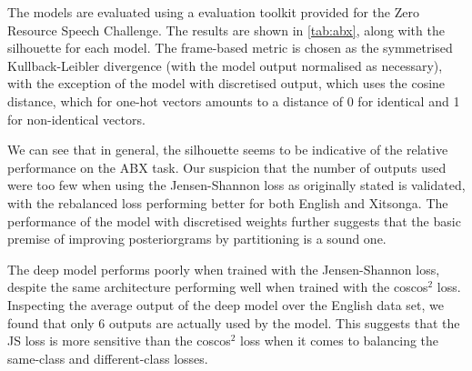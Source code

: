 The models are evaluated using a evaluation toolkit provided for the Zero Resource Speech Challenge.
The results are shown in \cref{tab:abx}, along with the silhouette for each model.
The frame-based metric is chosen as the symmetrised Kullback-Leibler divergence (with the model output normalised as necessary), with the exception of the model with discretised output, which uses the cosine distance, which for one-hot vectors amounts to a distance of 0 for identical and 1 for non-identical vectors.

We can see that in general, the silhouette seems to be indicative of the relative performance on the ABX task.
Our suspicion that the number of outputs used were too few when using the Jensen-Shannon loss as originally stated is validated, with the rebalanced loss performing better for both English and Xitsonga.
The performance of the model with discretised weights further suggests that the basic premise of improving posteriorgrams by partitioning is a sound one.

The deep model performs poorly when trained with the Jensen-Shannon loss, despite the same architecture performing well when trained with the coscos$^2$ loss.
Inspecting the average output of the deep model over the English data set, we found that only 6 outputs are actually used by the model.
This suggests that the JS loss is more sensitive than the coscos$^2$ loss when it comes to balancing the same-class and different-class losses.
